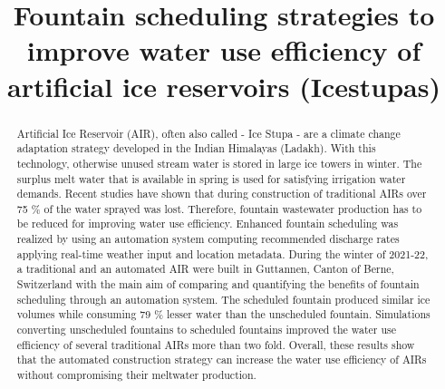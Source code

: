 \documentclass[tc, manuscript]{copernicus}
\begin{document}
\title{Fountain scheduling strategies to improve water use efficiency of artificial
ice reservoirs (Icestupas)}

\def\Authors{Suryanarayanan Balasubramanian\,$^{1,2}$, Martin Hoelzle\,$^{1}$Roger Waser\,$^{3}$, $Martin Von
Burg^{3}\,$}

\def\Address{$^{1}$University of Fribourg, Department of Geosciences, Fribourg, Switzerland $^{2}$University of
Applied Sciences and Arts, Luzern, Switzerland} \def\corrAuthor{Suryanarayanan Balasubramanian}





\maketitle

\begin{abstract}

  Artificial Ice Reservoir (AIR), often also called - Ice Stupa - are a climate change adaptation strategy
  developed in the Indian Himalayas (Ladakh). With this technology, otherwise unused stream water is stored in
  large ice towers in winter. The surplus melt water that is available in spring is used for satisfying
  irrigation water demands. Recent studies have shown that during construction of traditional AIRs over 75 \% of
  the water sprayed was lost. Therefore, fountain wastewater production has to be reduced for improving water use
  efficiency. Enhanced fountain scheduling was realized by using an automation system computing recommended
  discharge rates applying real-time weather input and location metadata. During the winter of 2021-22, a
  traditional and an automated AIR were built in Guttannen, Canton of Berne, Switzerland with the main aim of
  comparing and quantifying the benefits of fountain scheduling through an automation system. The scheduled
  fountain produced similar ice volumes while consuming 79 \% lesser water than the unscheduled fountain.
  Simulations converting unscheduled fountains to scheduled fountains improved the water use efficiency of
  several traditional AIRs more than two fold. Overall, these results show that the automated construction
  strategy can increase the water use efficiency of AIRs without compromising their meltwater production.

\end{abstract}
\end{document}
